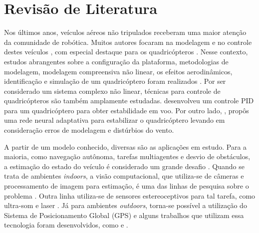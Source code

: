 \documentclass[a4paper, 12pt]{article}
\begin{document}
\newpage

\section{Revisão de Literatura}
\label{sec:rev}

Nos últimos anos, veículos aéreos não tripulados receberam uma maior atenção da comunidade de robótica. Muitos autores focaram na modelagem e no controle destes veículos \cite{Ye2006},  com especial destaque para os quadricópteros \cite{Altug2002}. Nesse contexto, estudos abrangentes sobre a configuração da plataforma, metodologias de modelagem, modelagem compreensiva não linear, os efeitos aerodinâmicos, identificação e simulação de um quadricóptero foram realizados \cite{Zhang2014} \cite{Gibiansky2010}. Por ser considerado um sistema complexo não linear, técnicas para controle de quadricópteros são também amplamente estudadas. \cite{Salih2010} desenvolveu um controle PID para um quadricóptero para obter estabilidade em voo. Por outro lado, \cite{Nicol2008}, propôs uma rede neural adaptativa para estabilizar o quadricóptero levando em consideração erros de modelagem e distúrbios do vento.

A partir de um modelo conhecido, diversas são as aplicações em estudo. Para a maioria, como navegação autônoma, tarefas multiagentes e desvio de obstáculos, a estimação do estado do veículo é considerado um grande desafio \cite{Achtelik2009}. Quando se trata de ambientes \textit{indoors}, a visão computacional, que utiliza-se de câmeras e processamento de imagem para estimação, é uma das linhas de pesquisa sobre o problema \cite{Shen2013} \cite{Blosch2010} \cite{Shen2013a}. Outra linha utiliza-se de sensores estereoceptivos para tal tarefa, como ultra-som \cite{Roberts2007} e laser \cite{Grzonka2012}. Já para ambientes \textit{outdoors}, torna-se possível a utilização do Sistema de Posicionamento Global (GPS) e alguns trabalhos que utilizam essa tecnologia foram desenvolvidos, como  \cite{Hoffmann2004} e \cite{Wendel2006}.

\end{document}
